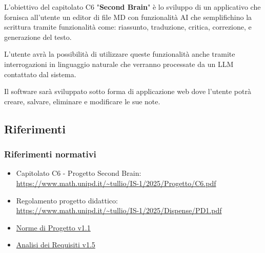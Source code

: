 \documentclass[a4paper,10pt]{article}
\begin{document}
L'obiettivo del capitolato C6 "\textbf{Second Brain}" è lo sviluppo di un applicativo che fornisca all'utente un editor di file MD con funzionalità AI che semplifichino la scrittura tramite funzionalità come: riassunto, traduzione, critica, correzione, e generazione del testo.

L'utente avrà la possibilità di utilizzare queste funzionalità anche tramite interrogazioni in linguaggio naturale che verranno processate da un LLM contattato dal sistema.

Il software sarà sviluppato sotto forma di applicazione web dove l'utente potrà creare, salvare, eliminare e modificare le sue note.

\subsection{Riferimenti}
\subsubsection{Riferimenti normativi}
\begin{itemize}
  \item Capitolato C6 - Progetto Second Brain: \\  \url{https://www.math.unipd.it/~tullio/IS-1/2025/Progetto/C6.pdf}
  \item Regolamento progetto didattico: \\ \url{https://www.math.unipd.it/~tullio/IS-1/2025/Dispense/PD1.pdf}
  \item \href{https://tool-8.github.io/Documentazione-SWE/pb/Norme_di_Progetto_v1.1.pdf}{Norme di Progetto v1.1}
  \item \href{https://tool-8.github.io/Documentazione-SWE/pb/Analisi_dei_Requisiti_v1.5.pdf}{Analisi dei Requisiti v1.5}
\end{itemize}
\end{document}
